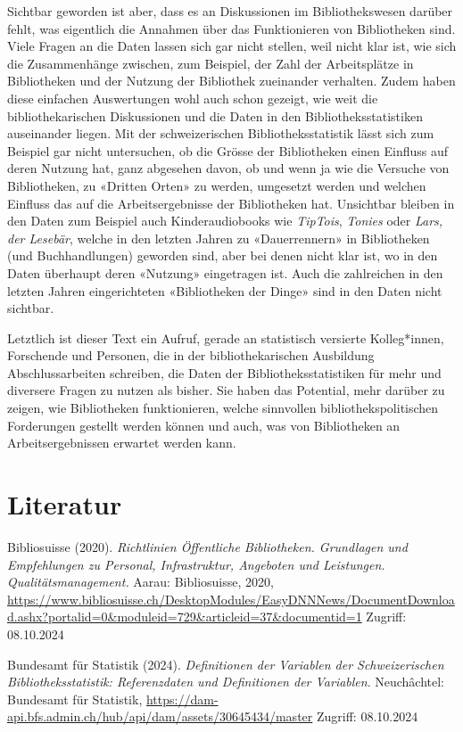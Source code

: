 \documentclass[a4paper,
fontsize=11pt,
oneside,
numbers=noperiodatend,
parskip=half-,
bibliography=totoc,
final
]{scrartcl}
\begin{document}
Sichtbar geworden ist aber, dass es an Diskussionen im Bibliothekswesen
darüber fehlt, was eigentlich die Annahmen über das Funktionieren von
Bibliotheken sind. Viele Fragen an die Daten lassen sich gar nicht
stellen, weil nicht klar ist, wie sich die Zusammenhänge zwischen, zum
Beispiel, der Zahl der Arbeitsplätze in Bibliotheken und der Nutzung der
Bibliothek zueinander verhalten. Zudem haben diese einfachen
Auswertungen wohl auch schon gezeigt, wie weit die bibliothekarischen
Diskussionen und die Daten in den Bibliotheksstatistiken auseinander
liegen. Mit der schweizerischen Bibliotheksstatistik lässt sich zum
Beispiel gar nicht untersuchen, ob die Grösse der Bibliotheken einen
Einfluss auf deren Nutzung hat, ganz abgesehen davon, ob und wenn ja wie
die Versuche von Bibliotheken, zu «Dritten Orten» zu werden, umgesetzt
werden und welchen Einfluss das auf die Arbeitsergebnisse der
Bibliotheken hat. Unsichtbar bleiben in den Daten zum Beispiel auch
Kinderaudiobooks wie \emph{TipTois}, \emph{Tonies} oder \emph{Lars, der
Lesebär}, welche in den letzten Jahren zu «Dauerrennern» in Bibliotheken
(und Buchhandlungen) geworden sind, aber bei denen nicht klar ist, wo in
den Daten überhaupt deren «Nutzung» eingetragen ist. Auch die
zahlreichen in den letzten Jahren eingerichteten «Bibliotheken der
Dinge» sind in den Daten nicht sichtbar.

Letztlich ist dieser Text ein Aufruf, gerade an statistisch versierte
Kolleg*innen, Forschende und Personen, die in der bibliothekarischen
Ausbildung Abschlussarbeiten schreiben, die Daten der
Bibliotheksstatistiken für mehr und diversere Fragen zu nutzen als
bisher. Sie haben das Potential, mehr darüber zu zeigen, wie
Bibliotheken funktionieren, welche sinnvollen bibliothekspolitischen
Forderungen gestellt werden können und auch, was von Bibliotheken an
Arbeitsergebnissen erwartet werden kann.

\section{Literatur}\label{literatur}

Bibliosuisse (2020). \emph{Richtlinien Öffentliche Bibliotheken.
Grundlagen und Empfehlungen zu Personal, Infrastruktur, Angeboten und
Leistungen. Qualitätsmanagement.} Aarau: Bibliosuisse, 2020,
\url{https://www.bibliosuisse.ch/DesktopModules/EasyDNNNews/DocumentDownload.ashx?portalid=0&moduleid=729&articleid=37&documentid=1}
Zugriff: 08.10.2024

Bundesamt für Statistik (2024). \emph{Definitionen der Variablen der
Schweizerischen Bibliotheksstatistik: Referenzdaten und Definitionen der
Variablen}. Neuchâchtel: Bundesamt für Statistik,
\url{https://dam-api.bfs.admin.ch/hub/api/dam/assets/30645434/master}
Zugriff: 08.10.2024
\end{document}
